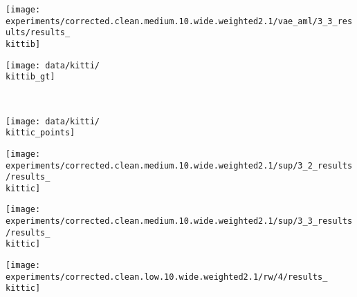 \begin{minipage}[t]{0.1\textwidth}
    \vspace{0px}\centering
    \texttt{[image: experiments/corrected.clean.medium.10.wide.weighted2.1/vae\_aml/3\_3\_results/results\_\\kittib]}
\end{minipage}
\begin{minipage}[t]{0.1\textwidth}
    \vspace{0px}\centering
    \texttt{[image: data/kitti/\\kittib\_gt]}
\end{minipage}
\\
\begin{minipage}[t]{0.02\textwidth}
    \vspace{0px}\centering
\end{minipage}
\begin{minipage}[t]{0.1\textwidth}
    \vspace{0px}\centering
    \texttt{[image: data/kitti/\\kittic\_points]}
\end{minipage}
\begin{minipage}[t]{0.1\textwidth}
    \vspace{0px}\centering
    \texttt{[image: experiments/corrected.clean.medium.10.wide.weighted2.1/sup/3\_2\_results/results\_\\kittic]}
\end{minipage}
\begin{minipage}[t]{0.1\textwidth}
    \vspace{0px}\centering
    \texttt{[image: experiments/corrected.clean.medium.10.wide.weighted2.1/sup/3\_3\_results/results\_\\kittic]}
\end{minipage}
\begin{minipage}[t]{0.1\textwidth}
    \vspace{0px}\centering
    \texttt{[image: experiments/corrected.clean.low.10.wide.weighted2.1/rw/4/results\_\\kittic]}
\end{minipage}
\begin{minipage}[t]{0.1\textwidth}
    \vspace{0px}\centering
\end{minipage}
